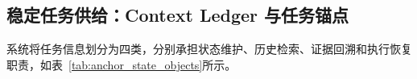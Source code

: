 




\subsection{稳定任务供给：Context Ledger 与任务锚点}


系统将任务信息划分为四类，分别承担状态维护、历史检索、证据回溯和执行恢复职责，如表~\ref{tab:anchor_state_objects}所示。



